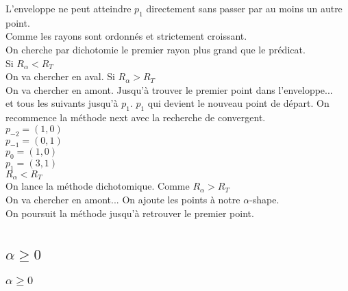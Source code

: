\documentclass{beamer}
\begin{document}
\begin{frame}
\begin{columns}[t]
\begin{column}{3cm}
\begin{block}{}
{        }
        {
          L'enveloppe ne peut atteindre $p_{1}$ directement sans passer par au moins un autre point.\\
        }
        {
          Comme les rayons sont ordonnés et strictement croissant.\\
          On cherche par dichotomie le premier rayon plus grand que le prédicat.\\
        }        
        {
          Si $R_{\alpha} < R_T$\\
          On va chercher en aval.
        }
        {
          Si $R_{\alpha} > R_T$\\
          On va chercher en amont.
        }
        {
          Jusqu'à trouver le premier point dans l'enveloppe...\\          
        }
        {
          et tous les suivants jusqu'à $p_1$.     
        }
        {
          $p_1$ qui devient le nouveau point de départ.
        }
        {
          On recommence la méthode next avec la recherche de convergent.\\
          $p_{-2} = (1, 0)$\\
          $p_{-1} = (0, 1)$\\
          $p_{0} = (1, 0)$\\
          $p_{1} = (3, 1)$\\
        }
        {
          $R_{\alpha} < R_T$\\
          On lance la méthode dichotomique. 
        }
        {
          Comme $R_{\alpha} > R_T$\\
          On va chercher en amont...
        }
        {
          On ajoute les points à notre $\alpha$-shape.\\
        }
        {
          On poursuit la méthode jusqu'à retrouver le premier point.
        }        
      \end{block}     
    \end{column}
  \end{columns} 

 
\end{frame}

\subsection{$\alpha \geq 0$}
\begin{frame}
\frametitle{$\alpha \geq 0$}
\end{frame}
\end{document}
